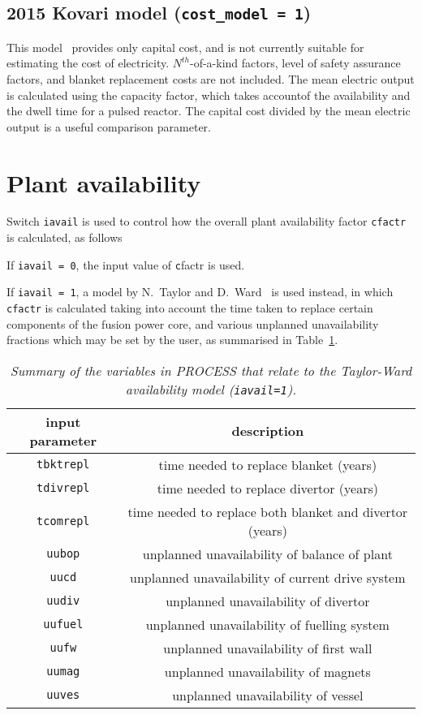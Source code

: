 \documentclass[11pt,a4paper]{report}
\begin{document}
\subsection{2015 Kovari model (\texttt{cost\_model = 1})}
This model~\cite{kovari_cost} provides only capital cost, and is not currently suitable for estimating the cost of electricity.  $N^{th}$-of-a-kind factors, level of safety assurance factors, and blanket replacement costs are not included.  The mean electric output is calculated using the capacity factor, which takes accountof the availability and the dwell time for a pulsed reactor.  The capital cost divided by the mean electric output is a useful comparison parameter.

\section{Plant availability}

Switch \texttt{iavail} is used to control how the overall plant availability
factor \texttt{cfactr} is calculated, as follows

If \texttt{iavail = 0}, the input value of \texttt cfactr is used.

If \texttt{iavail = 1}, a model by N.~Taylor and D.~Ward~\cite{TaylorWard_avail1999} is used instead, in which \texttt{cfactr} is calculated taking into account the time taken to replace certain components of the fusion power core, and various unplanned unavailability fractions which may be set by the user, as summarised in Table~\ref{tab:availability}.
\begin{table}[tbph]
\begin{center}
\begin{tabular}{||c|c||} \hline
input parameter & description \\ \hline
\texttt{tbktrepl}  & time needed to replace blanket (years) \\
\texttt{tdivrepl} & time needed to replace divertor (years) \\
\texttt{tcomrepl} & time needed to replace both blanket and divertor (years) \\
\texttt{uubop} & unplanned unavailability of balance of plant \\
\texttt{uucd} & unplanned unavailability of current drive system \\
\texttt{uudiv} & unplanned unavailability of divertor \\
\texttt{uufuel} & unplanned unavailability of fuelling system \\
\texttt{uufw} & unplanned unavailability of first wall \\
\texttt{uumag} & unplanned unavailability of magnets \\
\texttt{uuves} & unplanned unavailability of vessel \\
\hline
\end{tabular}
\end{center}
\caption[Parameters used in the Taylor-Ward availability model]
{\label{tab:availability}
  \textit{Summary of the variables in PROCESS that relate to
    the Taylor-Ward availability model (\texttt{iavail=1}).}
}
\end{table}
\end{document}
